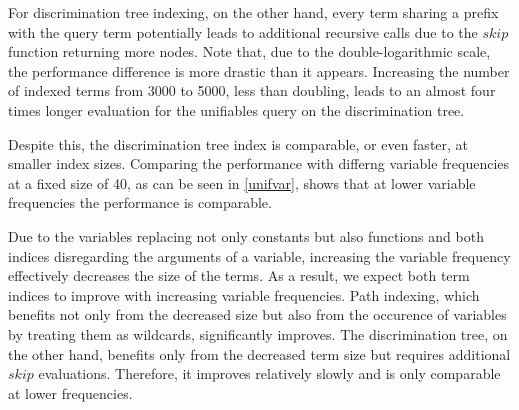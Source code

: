 For discrimination tree indexing, on the other hand, every term sharing a prefix with the query term potentially leads to additional recursive calls due to the $skip$ function returning more nodes. Note that, due to the double-logarithmic scale, the performance difference is more drastic than it appears. Increasing the number of indexed terms from 3000 to 5000, less than doubling, leads to an almost four times longer evaluation for the unifiables query on the discrimination tree.

Despite this, the discrimination tree index is comparable, or even faster, at smaller index sizes. Comparing the performance with differng variable frequencies at a fixed size of 40, as can be seen in \cref{unifvar}, shows that at lower variable frequencies the performance is comparable.

Due to the variables replacing not only constants but also functions and both indices disregarding the arguments of a variable, increasing the variable frequency effectively decreases the size of the terms. As a result, we expect both term indices to improve with increasing variable frequencies. Path indexing, which benefits not only from the decreased size but also from the occurence of variables by treating them as wildcards, significantly improves. The discrimination tree, on the other hand, benefits only from the decreased term size but requires additional $skip$ evaluations. Therefore, it improves relatively slowly and is only comparable at lower frequencies.

